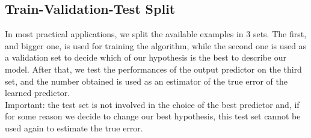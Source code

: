 \documentclass[12pt]{report}
\theoremstyle{plain}
\begin{document}
\begin{flushleft}
\subsection{Train-Validation-Test Split}
In most practical applications, we split the available examples in 3 sets. The 
first, and bigger one, is used for training the algorithm, while the second one 
is used as a validation set to decide which of our hypothesis is the best to 
describe our model. After that, we test the performances of the output 
predictor on the third set, and the number obtained is used as an estimator of 
the true error of the learned predictor.\\
Important: the test set is not involved in the choice of the best predictor 
and, if for some reason we decide to change our best hypothesis, this test set 
cannot be used again to estimate the true error.


\end{flushleft}
\end{document}
